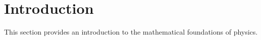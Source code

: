 \section{Introduction}
This section provides an introduction to the mathematical foundations of physics.
